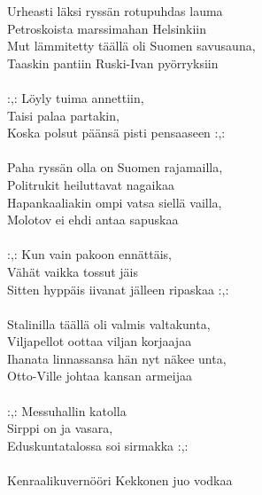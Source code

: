 
            Urheasti läksi ryssän rotupuhdas lauma \\
            Petroskoista marssimahan Helsinkiin \\
            Mut lämmitetty täällä oli Suomen savusauna, \\
            Taaskin pantiin Ruski-Ivan pyörryksiin \\
\hspace{10mm} \\
            :,: Löyly tuima annettiin, \\
            Taisi palaa partakin, \\
            Koska polsut päänsä pisti pensaaseen :,: \\
\hspace{10mm} \\
            Paha ryssän olla on Suomen rajamailla, \\
            Politrukit heiluttavat nagaikaa \\
            Hapankaaliakin ompi vatsa siellä vailla, \\
            Molotov ei ehdi antaa sapuskaa \\
\hspace{10mm} \\
            :,: Kun vain pakoon ennättäis, \\
            Vähät vaikka tossut jäis \\
            Sitten hyppäis iivanat jälleen ripaskaa :,: \\
\hspace{10mm} \\
            Stalinilla täällä oli valmis valtakunta, \\
            Viljapellot oottaa viljan korjaajaa \\
            Ihanata linnassansa hän nyt näkee unta, \\
            Otto-Ville johtaa kansan armeijaa \\
\hspace{10mm} \\
            :,: Messuhallin katolla \\
            Sirppi on ja vasara, \\
            Eduskuntatalossa soi sirmakka :,: \\
\hspace{10mm} \\
            Kenraalikuvernööri Kekkonen juo vodkaa \\
